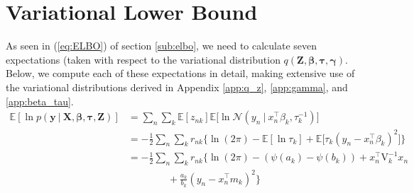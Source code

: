 \documentclass[twoside,11pt]{article}
\newcommand\given[1][]{\:#1\vert\:}
\newcommand{\transpose}[1]{#1^{\intercal}}
\newcommand{\nsum}{\sum\limits_{n}}
\newcommand{\ksum}{\sum\limits_{k}}
\newcommand{\boldbeta}{\boldsymbol\beta}
\newcommand{\boldgamma}{\boldsymbol\gamma}
\newcommand{\boldtau}{\boldsymbol\tau}
\newcommand{\E}{\mathbb{E}}
\newcommand{\pr}[1]{p \left( #1 \right)}
\begin{document}
\section{Variational Lower Bound} \label{app:elbo}  %
As seen in (\ref{eq:ELBO}) of section \ref{sub:elbo}, we need to calculate seven expectations (taken with respect to the variational distribution $q(\mathbf{Z}, \boldbeta, \boldtau, \boldgamma)$. Below, we compute each of these expectations in detail, making extensive use of the variational distributions derived in Appendix \ref{app:q_z}, \ref{app:gamma}, and \ref{app:beta_tau}. 
\begin{equation} \label{eq:e1_deriv}
\begin{split}
	\E[\ln\pr{\mathbf{y} \given \mathbf{X}, \boldbeta, \boldtau, \mathbf{Z}}] &= \nsum \ksum \E[z_{nk}] \E \Bigg[ \ln \mathcal{N}\left(y_n \given \transpose{x_n} \beta_k, \tau_k^{-1}\right)\Bigg]  \\
	&= -\frac{1}{2} \nsum \ksum r_{nk} \Big\{ \ln(2 \pi) - \E[\ln \tau_k] + \E\Big[\tau_k \left( y_n - \transpose{x_n} \beta_k\right)^2\Big]\Big\} \\
	&= -\frac{1}{2}\nsum \ksum r_{nk} \Big\{ \ln (2\pi) - (\psi(a_k) - \psi(b_k)) + \transpose{x_n}\mathrm{V}_k^{-1}x_n \\ & \qquad \qquad + \frac{a_k}{b_k}(y_n - \transpose{x_n}m_k)^2 \Big\}
\end{split}
\end{equation}
\end{document}
